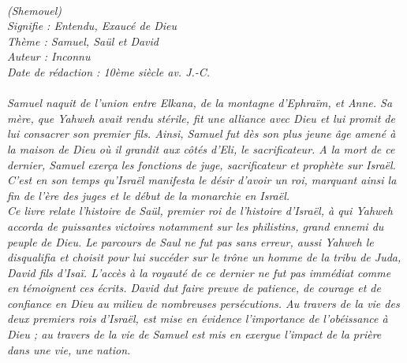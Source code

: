 \BFont
\noindent\hrulefill
{\footnotesize
\textit{
\bigskip
{\centering{}
\\(Shemouel)
\\Signifie : Entendu, Exaucé de Dieu
\\Thème : Samuel, Saül et David
\\Auteur : Inconnu
\\Date de rédaction : 10ème siècle av. J.-C.\\}
}
\textit{
\\Samuel naquit de l’union entre Elkana, de la montagne d’Ephraïm, et Anne.  Sa mère, que Yahweh avait rendu stérile, fit une alliance avec Dieu et lui promit de lui consacrer son premier fils. Ainsi, Samuel fut dès son plus jeune âge amené à la maison de Dieu où il grandit aux côtés d’Eli, le sacrificateur. A la mort de ce dernier, Samuel exerça les fonctions de juge, sacrificateur et prophète sur Israël. C’est en son temps qu’Israël manifesta le désir d’avoir un roi, marquant ainsi la fin de l’ère des juges et le début de la monarchie en Israël.
\\Ce livre relate l’histoire de Saül, premier roi de l’histoire d’Israël, à qui Yahweh accorda de puissantes victoires notamment sur les philistins, grand ennemi du peuple de Dieu. Le parcours de Saul ne fut pas sans erreur, aussi Yahweh le disqualifia et choisit pour lui succéder sur le trône un homme de la tribu de Juda, David fils d’Isaï. L’accès à la royauté de ce dernier ne fut pas immédiat comme en témoignent ces écrits. David dut faire preuve de patience, de courage et de confiance en Dieu au milieu de nombreuses persécutions. Au travers de la vie des deux premiers rois d’Israël, est mise en évidence l’importance de l’obéissance à Dieu ; au travers de la vie de Samuel est mis en exergue l’impact de la prière dans une vie, une nation.\bigskip
}
}
\par\nobreak\noindent\hrulefill
